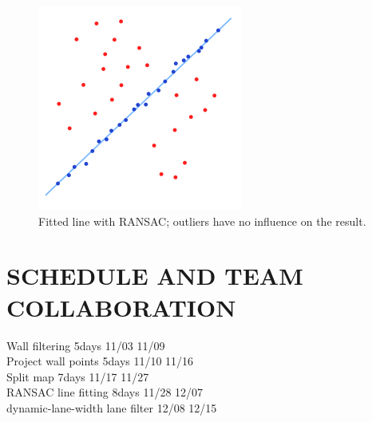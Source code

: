 \documentclass[letterpaper, 10 pt, conference]{ieeeconf}  %
\begin{document}
\begin{figure}[h!] %
\includegraphics[width=0.5\columnwidth]{RANSAC.png}
\centering
\caption{Fitted line with RANSAC; outliers have no influence on the result.}
\end{figure}




\section{SCHEDULE AND TEAM COLLABORATION}

Wall filtering	    5days	11/03	11/09\\
Project wall points	5days	11/10	11/16\\
Split map	        7days	11/17	11/27\\
RANSAC line fitting	8days	11/28	12/07\\
dynamic-lane-width lane filter 12/08 12/15\\

\addtolength{\textheight}{-12cm}   %



\end{document}
